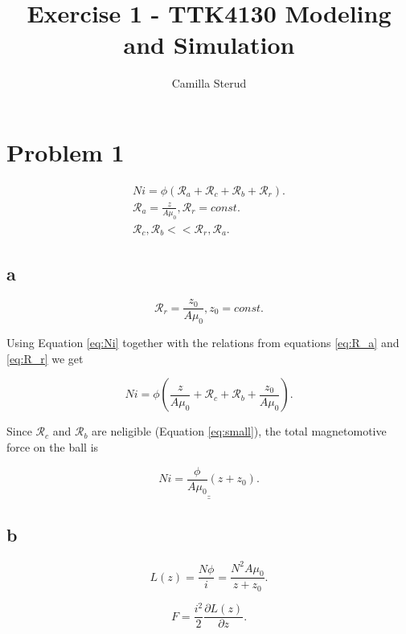 \documentclass{article}
\title{Exercise 1 - TTK4130 Modeling and Simulation}
\author{Camilla Sterud}
\date{}
\begin{document}
\maketitle

\newpage

\section{Problem 1}

\begin{align}
	Ni = \phi(\mathcal R_a + \mathcal R_c + \mathcal R_b + \mathcal R_r).\label{eq:Ni}\\ 
	\mathcal R_a = \frac{z}{A\mu_0}, \mathcal R_r = const. \label{eq:R_a} \\ 
	\mathcal R_c, \mathcal R_b << \mathcal R_r, \mathcal R_a. \label{eq:small}
\end{align}


\subsection{a}

\begin{equation}\label{eq:R_r}
	\mathcal R_r = \frac{z_0}{A\mu_0}, z_0 = const.
\end{equation}

Using Equation \ref{eq:Ni} together with the relations from equations \ref{eq:R_a} and \ref{eq:R_r} we get

\begin{equation*}
	Ni = \phi(\frac{z}{A\mu_0} + \mathcal R_c + \mathcal R_b + \frac{z_0}{A\mu_0}).
\end{equation*}

Since $\mathcal R_c$ and $\mathcal R_b$ are neligible (Equation \ref{eq:small}), the total magnetomotive force on the ball is

\begin{equation*}
	\underline{\underline{Ni = \frac{\phi}{A\mu_0}(z + z_0).}}
\end{equation*}

\subsection{b}

\begin{equation} \label{eq:induct}
	L(z) = \frac{N\phi}{i} = \frac{N^2A\mu_0}{z + z_0}.
\end{equation}

\begin{equation}\label{eq:magnF}
	F = \frac{i^2}{2}\frac{\partial L(z)}{\partial z}.
\end{equation}
\end{document}
